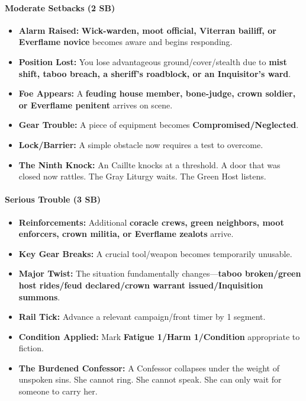 \paragraph{Moderate Setbacks (2 SB)}
\begin{itemize}
\item \textbf{Alarm Raised:} \textbf{Wick-warden, moot official, Viterran bailiff, or Everflame novice} becomes aware and begins responding.
\item \textbf{Position Lost:} You lose advantageous ground/cover/stealth due to \textbf{mist shift, taboo breach, a sheriff's roadblock, or an Inquisitor's ward}.
\item \textbf{Foe Appears:} A \textbf{feuding house member, bone-judge, crown soldier, or Everflame penitent} arrives on scene.
\item \textbf{Gear Trouble:} A piece of equipment becomes \textbf{Compromised/Neglected}.
\item \textbf{Lock/Barrier:} A simple obstacle now requires a test to overcome.
\item \textbf{The Ninth Knock:} An Caillte knocks at a threshold. A door that was closed now rattles. The Gray Liturgy waits. The Green Host listens.
\end{itemize}

\paragraph{Serious Trouble (3 SB)}
\begin{itemize}
\item \textbf{Reinforcements:} Additional \textbf{coracle crews, green neighbors, moot enforcers, crown militia, or Everflame zealots} arrive.
\item \textbf{Key Gear Breaks:} A crucial tool/weapon becomes temporarily unusable.
\item \textbf{Major Twist:} The situation fundamentally changes---\textbf{taboo broken/green host rides/feud declared/crown warrant issued/Inquisition summons}.
\item \textbf{Rail Tick:} Advance a relevant campaign/front timer by 1 segment.
\item \textbf{Condition Applied:} Mark \textbf{Fatigue 1/Harm 1/Condition} appropriate to fiction.
\item \textbf{The Burdened Confessor:} A Confessor collapses under the weight of unspoken sins. She cannot ring. She cannot speak. She can only wait for someone to carry her.
\end{itemize}

